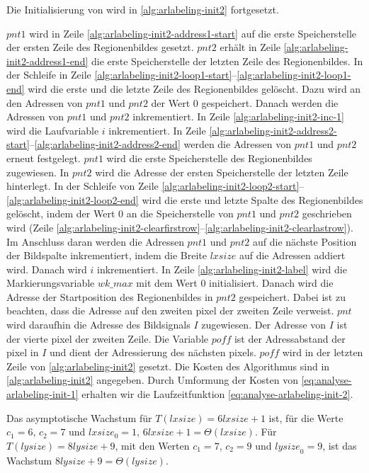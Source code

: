 Die Initialisierung von  wird in \autoref{alg:arlabeling-init2} fortgesetzt.

$\mathit{pnt1}$ wird in Zeile \ref{alg:arlabeling-init2-address1-start} auf die erste Speicherstelle der ersten Zeile
 des Regionenbildes gesetzt. $\mathit{pnt2}$ erhält in Zeile \ref{alg:arlabeling-init2-address1-end} die erste
 Speicherstelle der letzten Zeile des Regionenbildes.
In der Schleife in Zeile \ref{alg:arlabeling-init2-loop1-start}--\ref{alg:arlabeling-init2-loop1-end} wird die erste
 und die letzte Zeile des Regionenbildes gelöscht. Dazu wird an den Adressen von
 $\mathit{pnt1}$ und $\mathit{pnt2}$ der Wert $0$ gespeichert. Danach werden die Adressen von $\mathit{pnt1}$ und
 $\mathit{pnt2}$ inkrementiert. In Zeile \ref{alg:arlabeling-init2-inc-1} wird die Laufvariable $i$ inkrementiert. In
 Zeile \ref{alg:arlabeling-init2-address2-start}--\ref{alg:arlabeling-init2-address2-end} werden die Adressen
 von $\mathit{pnt1}$ und $\mathit{pnt2}$ erneut festgelegt. $\mathit{pnt1}$ wird die erste Speicherstelle des
 Regionenbildes zugewiesen. In $\mathit{pnt2}$ wird die Adresse der ersten Speicherstelle der letzten Zeile hinterlegt.
 In der Schleife von Zeile \ref{alg:arlabeling-init2-loop2-start}--\ref{alg:arlabeling-init2-loop2-end} wird die erste
 und letzte Spalte des Regionenbildes gelöscht, indem der Wert $0$ an die Speicherstelle von $\mathit{pnt1}$ und
 $\mathit{pnt2}$ geschrieben wird
 (Zeile \ref{alg:arlabeling-init2-clearfirstrow}--\ref{alg:arlabeling-init2-clearlastrow}). Im Anschluss daran werden
 die Adressen $\mathit{pnt1}$ und $\mathit{pnt2}$ auf die nächste Position der Bildspalte inkrementiert, indem die
 Breite $\mathit{lxsize}$ auf die Adressen addiert wird. Danach wird $i$ inkrementiert. In Zeile
 \ref{alg:arlabeling-init2-label} wird die Markierungsvariable $\mathit{wk\_max}$ mit dem Wert $0$ initialisiert.
 Danach wird die Adresse der Startposition des Regionenbildes in $\mathit{pnt2}$ gespeichert. Dabei ist zu beachten,
 dass die Adresse auf den zweiten \gls{pixel} der zweiten Zeile verweist. $\mathit{pnt}$ wird daraufhin die Adresse des
 Bildsignals $I$ zugewiesen. Der Adresse von $I$ ist der vierte \gls{pixel} der zweiten Zeile. Die Variable
 $\mathit{poff}$ ist der Adressabstand der \gls{pixel} in $I$ und dient der Adressierung des nächsten \glspl{pixel}.
 $\mathit{poff}$ wird in der letzten Zeile von \autoref{alg:arlabeling-init2} gesetzt. Die Kosten des Algorithmus sind
 in \autoref{alg:arlabeling-init2} angegeben. Durch Umformung der Kosten von \autoref{eq:analyse-arlabeling-init-1}
 erhalten wir die Laufzeitfunktion \autoref{eq:analyse-arlabeling-init-2}.

Das asymptotische Wachstum für $T(\mathit{lxsize}) = 6\mathit{lxsize} + 1$ ist, für die Werte $c_{1} = 6$,
 $c_{2} = 7$ und $\mathit{lxsize}_{0} = 1$, $6\mathit{lxsize} + 1 = \Theta(lxsize)$. Für
 $T(\mathit{lysize}) = 8\mathit{lysize} + 9$, mit den Werten $c_{1} = 7$, $c_{2} = 9$ und $\mathit{lysize}_{0} = 9$,
 ist das Wachstum $8\mathit{lysize} + 9 = \Theta(lysize)$.

